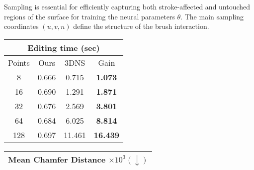 Sampling is essential for efficiently capturing both stroke-affected and untouched regions of the surface for training the neural parameters $\theta$. The main sampling coordinates $(u,v,n)$ define the structure of the brush interaction.
\begin{table*}[htbp]
  \centering
  \begin{minipage}{0.25\textwidth}
  
    \centering
    \setlength{\tabcolsep}{3pt}
    \begin{tabular}{|cccc|} 
    \hline
    \multicolumn{4}{|c|}{Editing time (sec)}                                                                               \\ \hline
    \multicolumn{1}{|c|}{Points} & \multicolumn{1}{c|}{Ours}    & \multicolumn{1}{c|}{3DNS}     & Gain              \\ \hline
    \multicolumn{1}{|c|}{8}             & \multicolumn{1}{c|}{0.666} & \multicolumn{1}{c|}{0.715}  & \textbf{1.073} \\ \hline
    \multicolumn{1}{|c|}{16}            & \multicolumn{1}{c|}{0.690} & \multicolumn{1}{c|}{1.291}  & \textbf{1.871}  \\ \hline
    \multicolumn{1}{|c|}{32}            & \multicolumn{1}{c|}{0.676} & \multicolumn{1}{c|}{2.569}  & \textbf{3.801}  \\ \hline
    \multicolumn{1}{|c|}{64}            & \multicolumn{1}{c|}{0.684} & \multicolumn{1}{c|}{6.025}  & \textbf{8.814}  \\ \hline
    \multicolumn{1}{|c|}{128}           & \multicolumn{1}{c|}{0.697} & \multicolumn{1}{c|}{11.461} & \textbf{16.439} \\ \hline
    \end{tabular}
    \caption{Comparison of editing times for stroke-based edits using our tubular sampling approach versus 3DNS point-based sampling, averaged over 100 iterations. Gain represents the relative speedup achieved by our method.}
      \label{tab:timing}
    \vspace{-1em}
  \end{minipage}
    \hfill
  \begin{minipage}{0.58\textwidth}
    \centering
    \setlength{\tabcolsep}{3pt}
    \begin{tabular}{|ccccccc|}
    \hline
    \multicolumn{7}{|c|}{Mean   Chamfer Distance $\times 10^3 (\downarrow)$}                                                                                                                                               \\ \hline

\end{tabular}
\end{minipage}
\end{table*}
